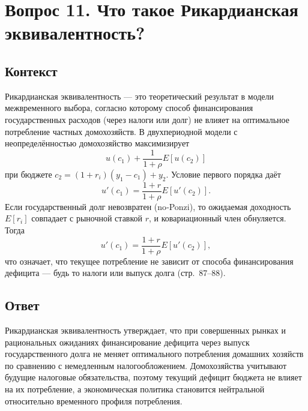 \section*{Вопрос 11. Что такое Рикардианская эквивалентность?}

\subsection*{Контекст}
Рикардианская эквивалентность — это теоретический результат в модели межвременного выбора, согласно которому способ финансирования 
государственных расходов (через налоги или долг) не влияет на оптимальное потребление частных домохозяйств. В двухпериодной модели с 
неопределённостью домохозяйство максимизирует
\[
u(c_1) + \frac{1}{1+\rho}E[u(c_2)]
\]
при бюджете \(c_2 = (1 + r_i)(y_1 - c_1) + y_2\). Условие первого порядка даёт
\[
u'(c_1) = \frac{1+r}{1+\rho}E[u'(c_2)].
\]
Если государственный долг невозвратен (no‑Ponzi), то ожидаемая доходность \(E[r_i]\) совпадает с рыночной ставкой \(r\), и 
ковариационный член обнуляется. Тогда
\[
u'(c_1) = \frac{1+r}{1+\rho}E[u'(c_2)],
\]
что означает, что текущее потребление не зависит от способа финансирования дефицита — будь то налоги или выпуск долга (стр.~87–88).

\subsection*{Ответ}
Рикардианская эквивалентность утверждает, что при совершенных рынках и рациональных ожиданиях финансирование дефицита через выпуск
 государственного долга не меняет оптимального потребления домашних хозяйств по сравнению с немедленным налогообложением. 
 Домохозяйства учитывают будущие налоговые обязательства, поэтому текущий дефицит бюджета не влияет на их потребление, 
 а экономическая политика становится нейтральной относительно временного профиля потребления.
